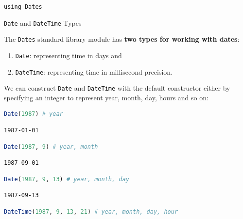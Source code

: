 \documentclass[
  notoc %
]{tufte-book}
\makeatletter
\providecommand{\tightlist}{%
  \setlength{\itemsep}{0pt}\setlength{\parskip}{0pt}
}
\newcommand{\passthrough}[1]{#1}
\renewcommand\subsubsection{%
\@startsection{subsubsection}{3}{\z@ }{-3.25ex\@plus -1ex \@minus -.2ex}{1.5ex \@plus .2ex}{\normalfont \normalsize \bfseries }
}
\makeatother
\begin{document}
\begin{lstlisting}
using Dates
\end{lstlisting}

\hypertarget{sec:dates_types}{%
\subsubsection{\texorpdfstring{\texttt{Date} and \texttt{DateTime}
Types}{Date and DateTime Types}}\label{sec:dates_types}}

The \passthrough{\lstinline!Dates!} standard library module has
\textbf{two types for working with dates}:

\begin{enumerate}
\def\labelenumi{\arabic{enumi}.}
\tightlist
\item
  \passthrough{\lstinline!Date!}: representing time in days and
\item
  \passthrough{\lstinline!DateTime!}: representing time in millisecond
  precision.
\end{enumerate}

We can construct \passthrough{\lstinline!Date!} and
\passthrough{\lstinline!DateTime!} with the default constructor either
by specifying an integer to represent year, month, day, hours and so on:

\begin{lstlisting}[language=Julia]
Date(1987) # year
\end{lstlisting}

\begin{lstlisting}[language=Output]
1987-01-01
\end{lstlisting}

\begin{lstlisting}[language=Julia]
Date(1987, 9) # year, month
\end{lstlisting}

\begin{lstlisting}[language=Output]
1987-09-01
\end{lstlisting}

\begin{lstlisting}[language=Julia]
Date(1987, 9, 13) # year, month, day
\end{lstlisting}

\begin{lstlisting}[language=Output]
1987-09-13
\end{lstlisting}

\begin{lstlisting}[language=Julia]
DateTime(1987, 9, 13, 21) # year, month, day, hour
\end{lstlisting}
\end{document}
